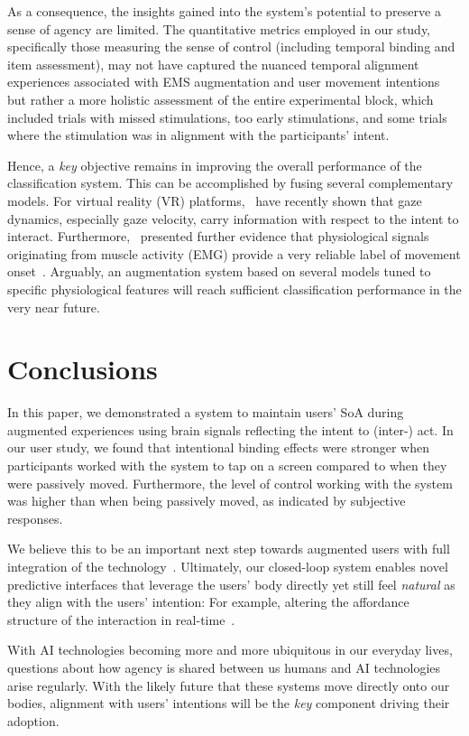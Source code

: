 As a consequence, the insights gained into the system's potential to preserve a sense of agency are limited. The quantitative metrics employed in our study, specifically those measuring the sense of control (including temporal binding and item assessment), may not have captured the nuanced temporal alignment experiences associated with EMS augmentation and user movement intentions but rather a more holistic assessment of the entire experimental block, which included trials with missed stimulations, too early stimulations, and some trials where the stimulation was in alignment with the participants' intent.

Hence, a \textit{key} objective remains in improving the overall performance of the classification system. This can be accomplished by fusing several complementary models. For virtual reality (VR) platforms,~\citet{David-John2021-vg} have recently shown that gaze dynamics, especially gaze velocity, carry information with respect to the intent to interact. Furthermore,~\citet{Nguyen2023-me} presented further evidence that physiological signals originating from muscle activity (EMG) provide a very reliable label of movement onset~\cite{Nguyen2023-me}. Arguably, an augmentation system based on several models tuned to specific physiological features will reach sufficient classification performance in the very near future.

\section{Conclusions}
In this paper, we demonstrated a system to maintain users' SoA during augmented experiences using brain signals reflecting the intent to (inter-) act. In our user study, we found that intentional binding effects were stronger when participants worked with the system to tap on a screen compared to when they were passively moved. Furthermore, the level of control working with the system was higher than when being passively moved, as indicated by subjective responses.

We believe this to be an important next step towards augmented users with full integration of the technology~\cite{Mueller2020-dl}. Ultimately, our closed-loop system enables novel predictive interfaces that leverage the users' body directly yet still feel \textit{natural} as they align with the users' intention: For example, altering the affordance structure of the interaction in real-time~\cite{Gehrke2022-kz, Lopes2015-ze, Nataraj2020-wm}.

With AI technologies becoming more and more ubiquitous in our everyday lives, questions about how agency is shared between us humans and AI technologies arise regularly. With the likely future that these systems move directly onto our bodies, alignment with users' intentions will be the \textit{key} component driving their adoption.

